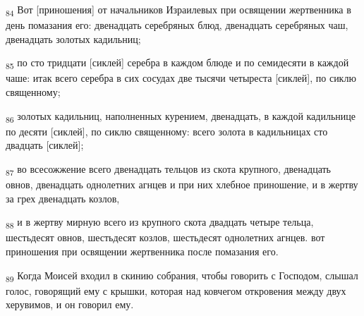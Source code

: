 \begin{tcolorbox}
\textsubscript{84} Вот [приношения] от начальников Израилевых при освящении жертвенника в день помазания его: двенадцать серебряных блюд, двенадцать серебряных чаш, двенадцать золотых кадильниц;
\end{tcolorbox}
\begin{tcolorbox}
\textsubscript{85} по сто тридцати [сиклей] серебра в каждом блюде и по семидесяти в каждой чаше: итак всего серебра в сих сосудах две тысячи четыреста [сиклей], по сиклю священному;
\end{tcolorbox}
\begin{tcolorbox}
\textsubscript{86} золотых кадильниц, наполненных курением, двенадцать, в каждой кадильнице по десяти [сиклей], по сиклю священному: всего золота в кадильницах сто двадцать [сиклей];
\end{tcolorbox}
\begin{tcolorbox}
\textsubscript{87} во всесожжение всего двенадцать тельцов из скота крупного, двенадцать овнов, двенадцать однолетних агнцев и при них хлебное приношение, и в жертву за грех двенадцать козлов,
\end{tcolorbox}
\begin{tcolorbox}
\textsubscript{88} и в жертву мирную всего из крупного скота двадцать четыре тельца, шестьдесят овнов, шестьдесят козлов, шестьдесят однолетних агнцев. вот приношения при освящении жертвенника после помазания его.
\end{tcolorbox}
\begin{tcolorbox}
\textsubscript{89} Когда Моисей входил в скинию собрания, чтобы говорить с Господом, слышал голос, говорящий ему с крышки, которая над ковчегом откровения между двух херувимов, и он говорил ему.
\end{tcolorbox}

